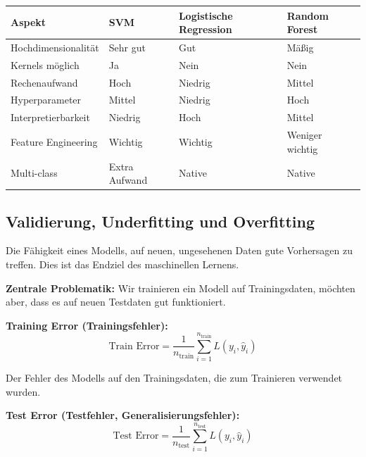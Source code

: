 
\begin{table}[h]
    \centering
    \small
    \begin{tabular}{|l|l|l|l|}
        \hline
        \textbf{Aspekt} & \textbf{SVM} & \textbf{Logistische Regression} & \textbf{Random Forest} \\
        \hline
        Hochdimensionalität & Sehr gut & Gut & Mäßig \\
        \hline
        Kernels möglich & Ja & Nein & Nein \\
        \hline
        Rechenaufwand & Hoch & Niedrig & Mittel \\
        \hline
        Hyperparameter & Mittel & Niedrig & Hoch \\
        \hline
        Interpretierbarkeit & Niedrig & Hoch & Mittel \\
        \hline
        Feature Engineering & Wichtig & Wichtig & Weniger wichtig \\
        \hline
        Multi-class & Extra Aufwand & Native & Native \\
        \hline
    \end{tabular}
\end{table}

\newpage

\subsection{Validierung, Underfitting und Overfitting}

Die Fähigkeit eines Modells, auf neuen, ungesehenen Daten gute Vorhersagen zu treffen. Dies ist das Endziel des maschinellen Lernens.

\textbf{Zentrale Problematik:} Wir trainieren ein Modell auf Trainingsdaten, möchten aber, dass es auf neuen Testdaten gut funktioniert.


\textbf{Training Error (Trainingsfehler):}
$$\text{Train Error} = \frac{1}{n_{\text{train}}} \sum_{i=1}^{n_{\text{train}}} L(y_i, \hat{y}_i)$$

Der Fehler des Modells auf den Trainingsdaten, die zum Trainieren verwendet wurden.

\textbf{Test Error (Testfehler, Generalisierungsfehler):}
$$\text{Test Error} = \frac{1}{n_{\text{test}}} \sum_{i=1}^{n_{\text{test}}} L(y_i, \hat{y}_i)$$

